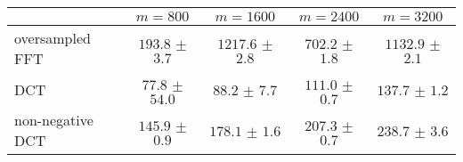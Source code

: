 \centering
\renewcommand{\arraystretch}{1.2}
\begin{tabular}{@{}lcccc@{}}
\toprule
 & $m=800$ & $m=1600$ & $m=2400$ & $m=3200$\\
\midrule
oversampled FFT & $193.8$ $\pm$ $3.7$ & $1217.6$ $\pm$ $2.8$ & $702.2$ $\pm$ $1.8$ & $1132.9$ $\pm$ $2.1$ \\
DCT & $77.8$ $\pm$ $54.0$ & $88.2$ $\pm$ $7.7$ & $111.0$ $\pm$ $0.7$ & $137.7$ $\pm$ $1.2$ \\
non-negative DCT & $145.9$ $\pm$ $0.9$ & $178.1$ $\pm$ $1.6$ & $207.3$ $\pm$ $0.7$ & $238.7$ $\pm$ $3.6$ \\
\bottomrule
\end{tabular}
